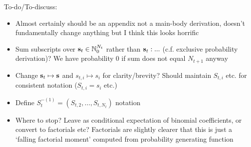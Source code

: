 \documentclass{article}
\begin{document}
{\color{red}
	To-do/To-discuss:
	\begin{itemize}
		\item Almost certainly should be an appendix not a main-body derivation, doesn't fundamentally change anything but I think this looks horrific
		\item Sum subscripts over ${\bf s}_t \in \mathbb{N}_0^{N_t}$ rather than ${\bf s}_t : ...$ (c.f. exclusive probability derivation)? We have probability 0 if sum does not equal $N_{t+1}$ anyway
		\item Change ${\bf s}_t \mapsto {\bf s}$ and $s_{t,i} \mapsto s_i$ for clarity/brevity? Should maintain $S_{t,i}$ etc. for consistent notation ($S_{t,i} = s_i$ etc.)
		\item Define $S_t^{-(1)} = (S_{t,2}, \dots, S_{t, N_t})$ notation
		\item Where to stop? Leave as conditional expectation of binomial coefficients, or convert to factorials etc? Factorials are slightly clearer that this is just a `falling factorial moment' computed from probability generating function
	\end{itemize}
}
\end{document}
